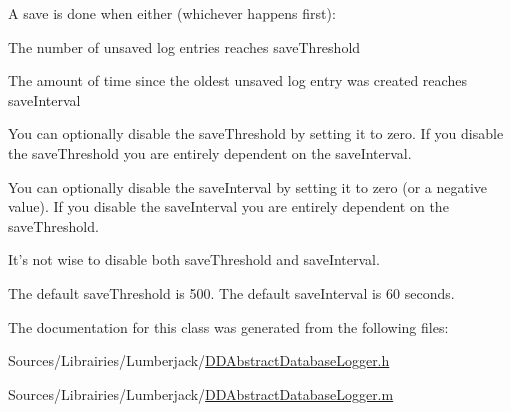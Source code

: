 A save is done when either (whichever happens first)\-:


\begin{DoxyItemize}
\item The number of unsaved log entries reaches save\-Threshold
\item The amount of time since the oldest unsaved log entry was created reaches save\-Interval
\end{DoxyItemize}

You can optionally disable the save\-Threshold by setting it to zero. If you disable the save\-Threshold you are entirely dependent on the save\-Interval.

You can optionally disable the save\-Interval by setting it to zero (or a negative value). If you disable the save\-Interval you are entirely dependent on the save\-Threshold.

It's not wise to disable both save\-Threshold and save\-Interval.

The default save\-Threshold is 500. The default save\-Interval is 60 seconds. 

The documentation for this class was generated from the following files\-:\begin{DoxyCompactItemize}
\item 
Sources/\-Librairies/\-Lumberjack/\hyperlink{_d_d_abstract_database_logger_8h}{D\-D\-Abstract\-Database\-Logger.\-h}\item 
Sources/\-Librairies/\-Lumberjack/\hyperlink{_d_d_abstract_database_logger_8m}{D\-D\-Abstract\-Database\-Logger.\-m}\end{DoxyCompactItemize}
